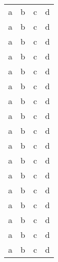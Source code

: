 \documentclass{article}
\begin{document}
\begin{longtable}{l
                      c
                      c
                      c}
    a & b & c & d \\
    a & b & c & d \\
    a & b & c & d \\
    a & b & c & d \\
    a & b & c & d \\
    a & b & c & d \\
    a & b & c & d \\
    a & b & c & d \\
    a & b & c & d \\
    a & b & c & d \\
    a & b & c & d \\
    a & b & c & d \\
    a & b & c & d \\
    a & b & c & d \\
    a & b & c & d \\
    a & b & c & d \\
    a & b & c & d \\
\end{longtable}

\cite{taborda2030}





    
\end{document}
